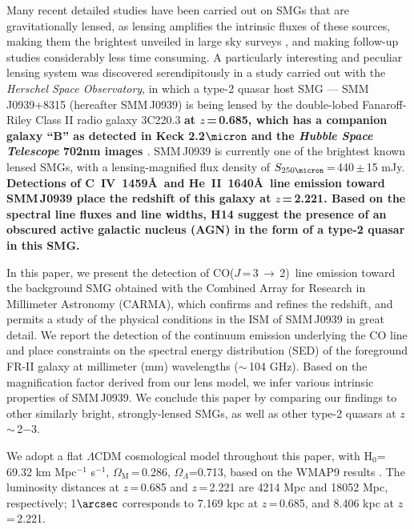 \documentclass[iop, revtex4]{emulateapj}
\newcommand{\CO}{\mbox{CO($J$\,=\,3\,$\rightarrow$\,2) }}
\newcommand{\pmOne}{\mbox{$^{-1}$}}
\begin{document}
Many recent detailed studies have been carried out on SMGs that are gravitationally lensed,
 as lensing amplifies the intrinsic fluxes of these sources, making them the brightest unveiled in large sky surveys \citep{Negrello10a,Vieira10a,Oliver12a}, and making follow-up studies considerably less time consuming.
A particularly interesting and peculiar lensing system was discovered serendipitously in a study carried out with the {\it Herschel Space Observatory}, in which
a type-2 quasar host SMG --- SMM\,J0939+8315 (hereafter SMM\,J0939) is being lensed by the double-lobed Fanaroff-Riley
Class II \citep*[FR-II; ][]{Fanaroff74} radio galaxy 3C220.3 {\bf at $z$\,=\,0.685, which has a
companion galaxy ``B'' as detected in Keck 2.2$\micron$ and the {\it Hubble Space Telescope} 702nm images \citep[hereafter H14]{Haas14}}.
SMM\,J0939 is currently one of the brightest known lensed
SMGs, with a lensing-magnified flux density of $S_\textrm{250\micron}$\,=\,440\,$\pm$\,15 mJy.
{\bf Detections of C~{\scriptsize\sc IV}~1459\AA\
 and He~{\scriptsize\sc II}~1640\AA\ line emission toward SMM\,J0939
 place the redshift of this galaxy at $z$\,=\,2.221. Based on the spectral line fluxes and line widths, H14 suggest the presence of an obscured active galactic nucleus (AGN) in the form of a type-2 quasar in this SMG.}
 
In this paper, we present the detection of \CO line emission toward the background SMG obtained with the Combined
Array for Research in Millimeter Astronomy (CARMA), which confirms and refines the redshift, and permits a study of the physical conditions in the ISM of SMM\,J0939 in great detail. We report the detection of the continuum emission underlying the CO line and place constraints on the spectral energy distribution (SED) of the foreground FR-II galaxy at millimeter (mm) wavelengths ($\sim$\,104 GHz). Based on the magnification factor derived from our lens model, we infer various intrinsic properties of SMM\,J0939. We 
conclude this paper by comparing our findings to other similarly bright, strongly-lensed SMGs, as well as other type-2 quasars at $z$\,$\sim$\,2$-$3.

We adopt a flat $\Lambda$CDM cosmological model throughout this paper, with H$_0$= 69.32 km\,\,Mpc\pmOne\,\,s\pmOne, $\Omega_\textrm{M}$\,=\,0.286, $\Omega_\Lambda$=0.713, based on the WMAP9 results \citep{Hinshaw13a}.
The luminosity distances at $z$\,=\,0.685 and $z$\,=\,2.221 are 4214 Mpc and 18052 Mpc, respectively; 1$\arcsec$
corresponds to 7.169 kpc at $z$\,=\,0.685, and 8.406 kpc at $z$\,=\,2.221.
\end{document}
